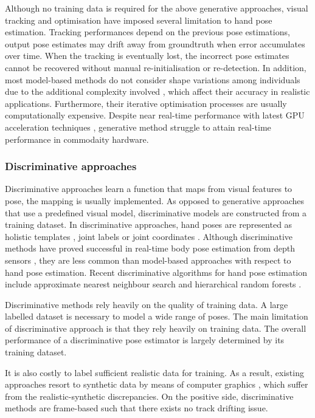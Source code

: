 Although no training data is required for the above generative approaches, visual tracking and optimisation have imposed several limitation to hand pose estimation.
Tracking performances depend on the previous pose estimations, output pose estimates may drift away from groundtruth when error accumulates over time. 
When the tracking is eventually lost, the incorrect pose estimates cannot be recovered without manual re-initialisation or re-detection. 
In addition, most model-based methods do not consider shape variations among individuals due to the additional complexity involved \cite{Erol2007}, which affect their accuracy in realistic applications.   
Furthermore, their iterative optimisation processes are usually computationally expensive. Despite near real-time performance with latest GPU acceleration techniques \cite{Oikonomidis2011}, generative method struggle to attain real-time performance in commodaity hardware. 

\subsubsection{Discriminative approaches} 
Discriminative approaches learn a function that maps from visual features to pose, the mapping is usually implemented. As opposed to generative approaches that use a predefined visual model, discriminative models are constructed from a training dataset.   
In discriminative approaches, hand poses are represented as holistic templates \cite{Wang2009}, joint labels \cite{Shotton2011} or joint coordinates \cite{Girshick2011}.
Although discriminative methods have proved successful in real-time body pose estimation from depth sensors \cite{Shotton2011, Girshick2011, Baak2011, Sun2012}, they are less common than model-based approaches with respect to hand pose estimation.  
Recent discriminative algorithms for hand pose estimation include approximate nearest neighbour search \cite{Romero2009, Wang2009} and hierarchical random forests \cite{Keskin2012}. 

Discriminative methods rely heavily on the quality of training data. A large labelled dataset is necessary to model a wide range of poses. 
The main limitation of discriminative approach is that they rely heavily on training data. 
The overall performance of a discriminative pose estimator is largely determined by its training dataset.   

It is also costly to label sufficient realistic data for training. As a result, existing approaches resort to synthetic data by means of computer graphics \cite{Romero2009, Keskin2012}, which suffer from the realistic-synthetic discrepancies.
On the positive side, discriminative methods are frame-based such that there exists no track drifting issue. 

